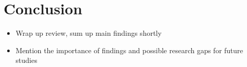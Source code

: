 \section{Conclusion}
\begin{itemize}
    \item Wrap up review, sum up main findings shortly
    \item Mention the importance of findings and possible research gaps for future studies
\end{itemize}